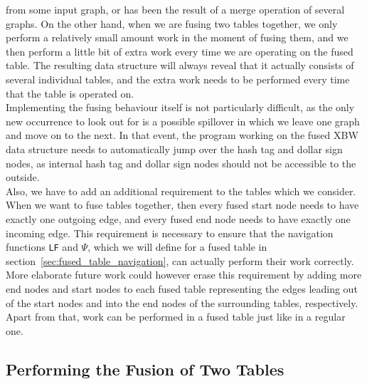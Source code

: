 \documentclass[a4paper,12pt,twoside,BCOR=10mm]{scrbook}
\begin{document}
from some input graph, or has been the result of a merge operation of several graphs. 
On the other hand, when we are fusing two tables together, 
we only perform a relatively small amount work in the moment of fusing them, 
and we then perform a little bit of extra work every time we are operating on the fused table. 
The resulting data structure will always reveal that it actually consists of several 
individual tables, and the extra work needs to be performed every time that the table is operated on. \\
Implementing the fusing behaviour itself is not particularly difficult, 
as the only new occurrence to look out for is a possible spillover in which 
we leave one graph and move on to the next. In that event, the program working 
on the fused XBW data structure needs to automatically jump over the hash tag and dollar sign nodes, 
as internal hash tag and dollar sign nodes should not be accessible to the outside. \\
Also, we have to add an additional requirement to the tables which we consider. 
When we want to fuse tables together, then every fused start node needs to have 
exactly one outgoing edge, and every fused end node needs to have exactly one incoming edge. 
This requirement is necessary to ensure that the navigation functions \texttt{LF} and $\Psi$, 
which we will define for a fused table 
in section~\ref{sec:fused_table_navigation}, can actually perform their work correctly. 
More elaborate future work could however erase this requirement by adding more end nodes and start nodes 
to each fused table representing the edges leading out of the start nodes and into the end nodes of the surrounding tables, 
respectively. \\
Apart from that, work can be performed in a fused table just like in a regular one.

\subsection{Performing the Fusion of Two Tables}
\label{sec:perform_fusion_of_two_tables}
\end{document}
